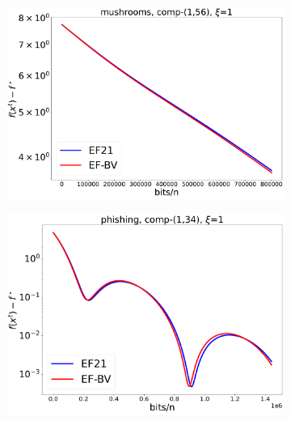 \documentclass{article} %
\theoremstyle{plain}
\theoremstyle{definition}
\theoremstyle{remark}
\begin{document}
   \begin{figure}[!htbp]
      \centering
      \begin{subfigure}[b]{0.48\textwidth}
         \centering
         \includegraphics[width=\textwidth]{img/mushrooms/CompK_56_1_mushrooms_8124workers_3000K_20_mushrooms_56_1_1_1_logreg_diff_conv.pdf}
      \end{subfigure}
      \hfill
      \begin{subfigure}[b]{0.48\textwidth}
         \centering
         \includegraphics[width=\textwidth]{img/phishing/CompK_34_1_phishing_8124workers_3000K_20_phishing_34_1_1_1_logreg_diff_conv.pdf}
      \end{subfigure}
      \caption{20 workers.}
      \hfill
      \begin{subfigure}[b]{0.48\textwidth}
         \centering

\end{subfigure}
\end{figure}
\end{document}
